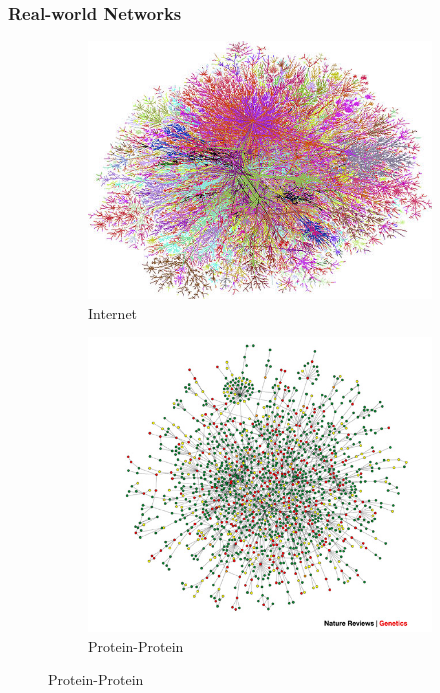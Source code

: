 \documentclass[10pt]{beamer}
\begin{document}
\begin{frame}
	\frametitle{Real-world Networks}
	\begin{figure}[!h]
		\begin{subfigure}[b]{0.3\textwidth}
			\includegraphics[width=\textwidth]{images/Steve-Jurvetson.jpg}
			\caption{Internet}
		\end{subfigure}\qquad
		\begin{subfigure}[b]{0.3\textwidth}
			\includegraphics[width= \textwidth]{images/yeastprotein-protein-interactions.jpeg}
			\caption{Protein-Protein }

\end{subfigure}
\end{figure}
\end{frame}
\end{document}
